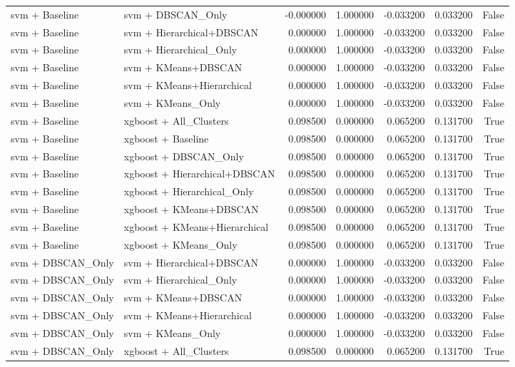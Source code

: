 \begin{tabular}{llrrrrr}
svm + Baseline & svm + DBSCAN_Only & -0.000000 & 1.000000 & -0.033200 & 0.033200 & False \\
svm + Baseline & svm + Hierarchical+DBSCAN & 0.000000 & 1.000000 & -0.033200 & 0.033200 & False \\
svm + Baseline & svm + Hierarchical_Only & 0.000000 & 1.000000 & -0.033200 & 0.033200 & False \\
svm + Baseline & svm + KMeans+DBSCAN & 0.000000 & 1.000000 & -0.033200 & 0.033200 & False \\
svm + Baseline & svm + KMeans+Hierarchical & 0.000000 & 1.000000 & -0.033200 & 0.033200 & False \\
svm + Baseline & svm + KMeans_Only & 0.000000 & 1.000000 & -0.033200 & 0.033200 & False \\
svm + Baseline & xgboost + All_Clusters & 0.098500 & 0.000000 & 0.065200 & 0.131700 & True \\
svm + Baseline & xgboost + Baseline & 0.098500 & 0.000000 & 0.065200 & 0.131700 & True \\
svm + Baseline & xgboost + DBSCAN_Only & 0.098500 & 0.000000 & 0.065200 & 0.131700 & True \\
svm + Baseline & xgboost + Hierarchical+DBSCAN & 0.098500 & 0.000000 & 0.065200 & 0.131700 & True \\
svm + Baseline & xgboost + Hierarchical_Only & 0.098500 & 0.000000 & 0.065200 & 0.131700 & True \\
svm + Baseline & xgboost + KMeans+DBSCAN & 0.098500 & 0.000000 & 0.065200 & 0.131700 & True \\
svm + Baseline & xgboost + KMeans+Hierarchical & 0.098500 & 0.000000 & 0.065200 & 0.131700 & True \\
svm + Baseline & xgboost + KMeans_Only & 0.098500 & 0.000000 & 0.065200 & 0.131700 & True \\
svm + DBSCAN_Only & svm + Hierarchical+DBSCAN & 0.000000 & 1.000000 & -0.033200 & 0.033200 & False \\
svm + DBSCAN_Only & svm + Hierarchical_Only & 0.000000 & 1.000000 & -0.033200 & 0.033200 & False \\
svm + DBSCAN_Only & svm + KMeans+DBSCAN & 0.000000 & 1.000000 & -0.033200 & 0.033200 & False \\
svm + DBSCAN_Only & svm + KMeans+Hierarchical & 0.000000 & 1.000000 & -0.033200 & 0.033200 & False \\
svm + DBSCAN_Only & svm + KMeans_Only & 0.000000 & 1.000000 & -0.033200 & 0.033200 & False \\
svm + DBSCAN_Only & xgboost + All_Clusters & 0.098500 & 0.000000 & 0.065200 & 0.131700 & True \\

\end{tabular}
